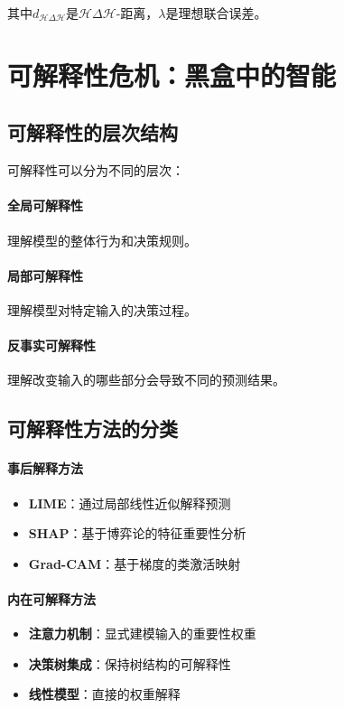 其中$d_{\mathcal{H}\Delta\mathcal{H}}$是$\mathcal{H}\Delta\mathcal{H}$-距离，$\lambda$是理想联合误差。

\section{可解释性危机：黑盒中的智能}

\subsection{可解释性的层次结构}

可解释性可以分为不同的层次：

\paragraph{全局可解释性}
理解模型的整体行为和决策规则。

\paragraph{局部可解释性}
理解模型对特定输入的决策过程。

\paragraph{反事实可解释性}
理解改变输入的哪些部分会导致不同的预测结果。

\subsection{可解释性方法的分类}

\paragraph{事后解释方法}
\begin{itemize}
\item \textbf{LIME}：通过局部线性近似解释预测
\item \textbf{SHAP}：基于博弈论的特征重要性分析
\item \textbf{Grad-CAM}：基于梯度的类激活映射
\end{itemize}

\paragraph{内在可解释方法}
\begin{itemize}
\item \textbf{注意力机制}：显式建模输入的重要性权重
\item \textbf{决策树集成}：保持树结构的可解释性
\item \textbf{线性模型}：直接的权重解释
\end{itemize}

